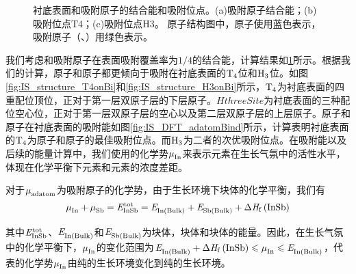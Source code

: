 \begin{figure}[htb]
{    }
    \caption{衬底表面和吸附原子的结合能和吸附位点。(a)吸附原子结合能；(b)吸附位点T4；(c)吸附位点H3。 原子结构图中，原子使用蓝色表示，吸附原子（、）用绿色表示。}
    \label{fig:IS_Bi_adatoms}
\end{figure}

我们考虑和吸附原子在表面吸附覆盖率为$1/ 4$的结合能，计算结果如\ref{fig:IS_Bi_adatoms}所示。根据我们的计算，原子和原子都更倾向于吸附在衬底表面的$\rm T_{4} \it$位和$\rm H_{3} \it$位。如图\ref{fig:IS_structure_T4onBi}和\ref{fig:IS_structure_H3onBi}所示，$\rm T_{4} \it$为衬底表面的四重配位顶位，正对于第一层双原子层的下层原子。$HthreeSite$为衬底表面的三种配位空心位，正对于第一层双原子层的空心以及第二层双原子层的上层原子。原子和原子在衬底表面的吸附能如图\ref{fig:IS_DFT_adatomBind}所示，计算表明衬底表面的$\rm T_{4} \it$为原子和原子的最佳吸附位点。而$\rm H_{3} \it$为二者的次优吸附位点。在吸附能以及后续的能量计算中，我们使用的化学势$\it \mu_{\rm In}^{\rm } \it$来表示元素在生长气氛中的活性水平，体现在化学平衡下元素和元素的浓度差距。

对于$\it \mu_{\rm adatom}^{\rm } \it$为吸附原子的化学势，由于生长环境下块体的化学平衡，我们有\chinesecolon
\begin{equation}
    \label{eq:IS_bulkEqmb}
    \muVar{In}{}+\muVar{Sb}{}=\energyVar{InSb}{tot}=\energyVar{In\left(Bulk\right)}{}+\energyVar{Sb\left(Bulk\right)}{}+\rm{\Delta} \it H_{\rm f}\left(\ce{InSb}\right)
\end{equation}

其中$\it E_{\rm InSb}^{\rm tot} \it$、$\it E_{\rm In\left(Bulk\right)}^{\rm } \it$和$\it E_{\rm Sb\left(Bulk\right)}^{\rm } \it$为块体，块体和块体的能量。因此，在生长气氛中的化学平衡下，$\it \mu_{\rm In}^{\rm } \it$的变化范围为$ \energyVar{In\left(Bulk\right)}{}+\rm{\Delta} \it H_{\rm f}\left(\ce{InSb}\right) \leqslant \muVar{In}{} \leqslant \energyVar{In\left(Bulk\right)}{}$，代表的化学势$\it \mu_{\rm In}^{\rm } \it$由纯的生长环境变化到纯的生长环境。

